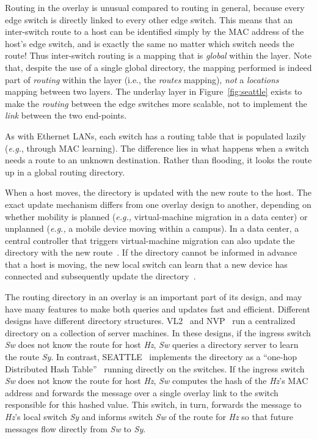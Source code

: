 Routing in the overlay is unusual compared to routing in general,
because every edge switch is directly linked to every other edge switch.
This means that an inter-switch route to a host
can be identified simply by the
MAC address of the host's edge switch, and is exactly the same
no matter which switch needs the route!
Thus inter-switch routing is a mapping that is {\it global}
within the layer.
%
%
Note that, despite the use of a single global directory, the mapping
performed is indeed part of \emph{routing} within the layer (i.e., the
{\it routes} mapping), \emph{not} a {\it locations} mapping between
two layers.  The underlay layer in Figure~\ref{fig:seattle} exists to
make the \emph{routing} between the edge switches more scalable, not
to implement the \emph{link} between the two end-points.

As with Ethernet LANs, each switch has a routing table that is
populated lazily ({\it e.g.}, through MAC learning).
The difference lies in what happens when a switch needs a route to
an unknown destination.
Rather than flooding, it looks the route up in a global routing
directory.

When a host moves, the directory is
updated with the new route to the host.  The exact update mechanism
differs from one overlay design to another, depending on whether
mobility is planned ({\it e.g.,} 
virtual-machine migration in a data center)
or unplanned ({\it e.g.,} a mobile device moving within a campus).  In a
data center, a central controller that triggers virtual-machine
migration can also update the directory with the new
route~\cite{vl2,nvp}.  If the directory cannot be informed in advance
that a host is moving, the new local switch can learn that a new
device has connected and subsequently update the
directory~\cite{seattle}.

The routing directory in an overlay is an important part of its design, 
and may have
many features to make both queries and updates fast and efficient.
Different designs have different directory structures.  VL2~\cite{vl2}
and NVP~\cite{nvp} run a centralized directory on a collection of
server machines.  In these designs, if the ingress switch {\it Sw}
does not know the route for host {\it Hz}, {\it Sw} queries a
directory server to learn the route {\it Sy}.  In contrast,
SEATTLE~\cite{seattle} implements the directory as a ``one-hop
Distributed Hash Table''~\cite{gupta} running directly on the
switches.  
If the ingress switch {\it Sw} does not know the route for
host {\it Hz}, {\it Sw} computes the hash of the {\it Hz}'s MAC
address and forwards the message over a single overlay link to the
switch responsible for this hashed value.  This switch, in turn,
forwards the message to {\it Hz}'s local switch {\it Sy} and informs
switch {\it Sw} of the route for {\it Hz} so that future messages flow
directly from {\it Sw} to {\it Sy}.

